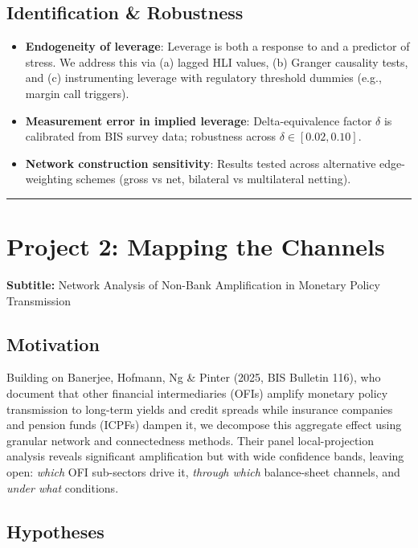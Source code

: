 \documentclass[11pt,a4paper]{article}
\begin{document}
\subsection{Identification \& Robustness}

\begin{itemize}
\item \textbf{Endogeneity of leverage}: Leverage is both a response to and a predictor of stress. We address this via (a) lagged HLI values, (b) Granger causality tests, and (c) instrumenting leverage with regulatory threshold dummies (e.g., margin call triggers).
\item \textbf{Measurement error in implied leverage}: Delta-equivalence factor $\delta$ is calibrated from BIS survey data; robustness across $\delta \in [0.02, 0.10]$.
\item \textbf{Network construction sensitivity}: Results tested across alternative edge-weighting schemes (gross vs net, bilateral vs multilateral netting).

\end{itemize}

\bigskip\noindent\rule{\textwidth}{0.4pt}\bigskip


\section{Project 2: Mapping the Channels}

\textbf{Subtitle:} Network Analysis of Non-Bank Amplification in Monetary Policy Transmission


\subsection{Motivation}

Building on Banerjee, Hofmann, Ng \& Pinter (2025, BIS Bulletin 116), who document
that other financial intermediaries (OFIs) amplify monetary policy transmission to
long-term yields and credit spreads while insurance companies and pension funds
(ICPFs) dampen it, we decompose this aggregate effect using granular network and
connectedness methods. Their panel local-projection analysis reveals significant
amplification but with wide confidence bands, leaving open: \textit{which} OFI sub-sectors
drive it, \textit{through which} balance-sheet channels, and \textit{under what} conditions.


\subsection{Hypotheses}
\end{document}
